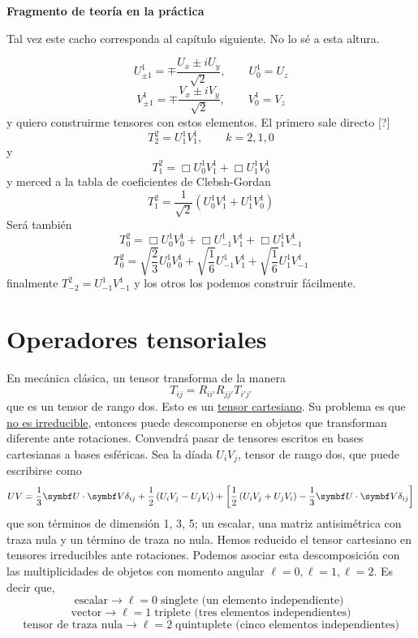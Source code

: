 \documentclass[10pt,oneside]{CBFT_book}
\begin{document}
\begin{ejemplo}{\bf Fragmento de teoría en la práctica}

Tal vez este cacho corresponda al capítulo siguiente. No lo sé a esta altura.

\[
	U_{\pm 1}^1 = \mp \frac{ U_x \pm i U_y }{\sqrt{2}}, \qquad U_0^1 = U_z
\]
\[
	V_{\pm 1}^1 = \mp \frac{ V_x \pm i V_y }{\sqrt{2}}, \qquad V_0^1 = V_z
\]
y quiero construirme tensores con estos elementos.
El primero sale directo [?] 
\[
	T_ 2^2 = U_1^1 V_1^1, \qquad k=2,1,0
\]
y 
\[
	T_1^2 = \Box  U_0^1 V_1^1 + \Box  U_1^1 V_0^1
\]
y merced a la tabla de coeficientes de Clebsh-Gordan
\[
	T_1^2 = \frac{1}{\sqrt{2}} \left( U_0^1 V_1^1 +  U_1^1 V_0^1 \right)
\]
Será también
\[
	T_0^2 = \Box  U_0^1 V_0^1 + \Box  U_{-1}^1 V_1^1 + \Box U_1^1 V_{-1}^1
\]
\[
	T_0^2 = \sqrt{\frac{2}{3}} U_0^1 V_0^1 + \sqrt{\frac{1}{6}} U_{-1}^1 V_1^1 + 
	\sqrt{\frac{1}{6}} U_1^1 V_{-1}^1
\]
finalmente $T_{-2}^2 = U_{-1}^1 V_{-1}^1$ y los otros los podemos construir fácilmente.

 
\end{ejemplo}



\section{Operadores tensoriales}

En mecánica clásica, un tensor transforma de la manera
\[
	T_{ij} = R_{ii'} R_{jj'} T_{i' j'}
\]
que es un tensor de rango dos. Esto es un \underline{tensor cartesiano}. Su problema es que \underline{no es 
irreducible}, entonces puede descomponerse en objetos que transforman diferente ante rotaciones.
Convendrá pasar de tensores escritos en bases cartesianas a bases esféricas.
Sea la díada $U_iV_j$, tensor de rango dos, que puede escribirse como 
\[
	UV = \frac{1}{3}\vb{U}\cdot\vb{V}\delta_{ij} + \frac{1}{2}\left( U_iV_j - U_jV_i \right) +
	\left[ \frac{1}{2}\left( U_iV_j + U_jV_i \right) - \frac{1}{3}\vb{U}\cdot\vb{V}\delta_{ij}\right]
\]
que son términos de dimensión 1, 3, 5; un escalar, una matriz antisimétrica con traza nula y un término
de traza no nula.
Hemos reducido el tensor cartesiano en tensores irreducibles ante rotaciones. 
Podemos asociar esta descomposición con las multiplicidades de objetos con momento angular 
$\ell=0, \ell=1, \ell=2$. Es decir que,
\[
	\text{escalar} \longrightarrow \ell=0 \; \text{singlete (un elemento independiente) }
\]
\[
	\text{vector} \longrightarrow \ell=1 \; \text{triplete (tres elementos independientes)}
\]
\[
	\text{tensor de traza nula} \longrightarrow \ell=2 \; \text{quintuplete (cinco elementos 
independientes)}
\]
\end{document}
